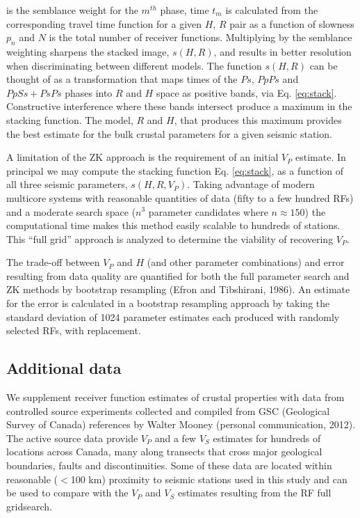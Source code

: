 \documentclass[review]{elsarticle}
\begin{document}
\noindent is the semblance weight for the $m^{th}$ phase, time $t_m$ is calculated from the corresponding travel time function for a given $H$, $R$ pair as a function of slowness $p_n$ and $N$ is the total number of receiver functions. Multiplying by the semblance weighting sharpens the stacked image, $s(H,R)$, and results in better resolution when discriminating between different models. The function $s(H,R)$ can be thought of as a transformation that maps times of the $Ps$, $PpPs$ and $PpSs+PsPs$ phases into $R$ and $H$ space as positive bands, via Eq. \ref{eq:stack}. Constructive interference where these bands intersect produce a maximum in the stacking function. The model, $R$ and $H$, that produces this maximum provides the best estimate for the bulk crustal parameters for a given seismic station.

A limitation of the ZK approach is the requirement of an initial $V_P$ estimate. In principal we may compute the stacking function Eq. \ref{eq:stack}, as a function of all three seismic parameters, $s(H,R,V_P)$. Taking advantage of modern multicore systems with reasonable quantities of data (fifty to a few hundred RFs) and a moderate search space ($n^3$ parameter candidates where $n \approx 150$) the computational time makes this method easily scalable to hundreds of stations. This ``full grid'' approach is analyzed to determine the viability of recovering $V_P$.

The trade-off between $V_P$ and $H$ (and other parameter combinations) and error resulting from data quality are quantified for both the full parameter search and ZK methods by bootstrap resampling (Efron and Tibshirani, 1986). An estimate for the error is calculated in a bootstrap resampling approach by taking the standard deviation of 1024 parameter estimates each produced with randomly selected RFs, with replacement.




\subsection{Additional data}

We supplement receiver function estimates of crustal properties with data from controlled source experiments collected and compiled from GSC (Geological Survey of Canada) references by Walter Mooney (personal communication, 2012). The active source data provide $V_P$ and a few $V_S$ estimates for hundreds of locations across Canada, many along transects that cross major geological boundaries, faults and discontinuities. Some of these data are located within reasonable ($<$100 km) proximity to seismic stations used in this study and can be used to compare with the $V_P$ and $V_S$ estimates resulting from the RF full gridsearch.
\end{document}
